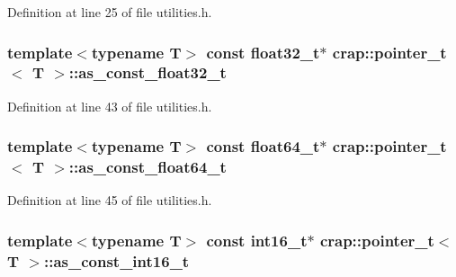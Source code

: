 Definition at line 25 of file utilities.\+h.

\hypertarget{structcrap_1_1pointer__t_afa325f26f6fb096a38c8215d5cfecdb4}{
\subsubsection[{as\+\_\+const\+\_\+float32\+\_\+t}]{\setlength{\rightskip}{0pt plus 5cm}template$<$typename T$>$ const {\bf float32\+\_\+t}$\ast$ {\bf crap\+::pointer\+\_\+t}$<$ T $>$\+::as\+\_\+const\+\_\+float32\+\_\+t}}\label{structcrap_1_1pointer__t_afa325f26f6fb096a38c8215d5cfecdb4}


Definition at line 43 of file utilities.\+h.

\hypertarget{structcrap_1_1pointer__t_a84605cb36a9a9fa5204122ca06ee126a}{
\subsubsection[{as\+\_\+const\+\_\+float64\+\_\+t}]{\setlength{\rightskip}{0pt plus 5cm}template$<$typename T$>$ const {\bf float64\+\_\+t}$\ast$ {\bf crap\+::pointer\+\_\+t}$<$ T $>$\+::as\+\_\+const\+\_\+float64\+\_\+t}}\label{structcrap_1_1pointer__t_a84605cb36a9a9fa5204122ca06ee126a}


Definition at line 45 of file utilities.\+h.

\hypertarget{structcrap_1_1pointer__t_ae390d11f93bef65281220f053dae1b09}{
\subsubsection[{as\+\_\+const\+\_\+int16\+\_\+t}]{\setlength{\rightskip}{0pt plus 5cm}template$<$typename T$>$ const int16\+\_\+t$\ast$ {\bf crap\+::pointer\+\_\+t}$<$ T $>$\+::as\+\_\+const\+\_\+int16\+\_\+t}}\label{structcrap_1_1pointer__t_ae390d11f93bef65281220f053dae1b09}


